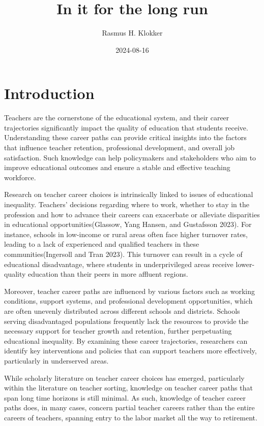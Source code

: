 \documentclass[
]{article}
\title{In it for the long run}
\author{Rasmus H. Klokker}
\date{2024-08-16}
\begin{document}
\maketitle

\hypertarget{introduction}{%
\section{Introduction}\label{introduction}}

Teachers are the cornerstone of the educational system, and their career trajectories significantly impact the quality of education that students receive. Understanding these career paths can provide critical insights into the factors that influence teacher retention, professional development, and overall job satisfaction. Such knowledge can help policymakers and stakeholders who aim to improve educational outcomes and ensure a stable and effective teaching workforce.

Research on teacher career choices is intrinsically linked to issues of educational inequality. Teachers' decisions regarding where to work, whether to stay in the profession and how to advance their careers can exacerbate or alleviate disparities in educational opportunities(Glassow, Yang Hansen, and Gustafsson 2023). For instance, schools in low-income or rural areas often face higher turnover rates, leading to a lack of experienced and qualified teachers in these communities(Ingersoll and Tran 2023). This turnover can result in a cycle of educational disadvantage, where students in underprivileged areas receive lower-quality education than their peers in more affluent regions.

Moreover, teacher career paths are influenced by various factors such as working conditions, support systems, and professional development opportunities, which are often unevenly distributed across different schools and districts. Schools serving disadvantaged populations frequently lack the resources to provide the necessary support for teacher growth and retention, further perpetuating educational inequality. By examining these career trajectories, researchers can identify key interventions and policies that can support teachers more effectively, particularly in underserved areas.

While scholarly literature on teacher career choices has emerged, particularly within the literature on teacher sorting, knowledge on teacher career paths that span long time horizons is still minimal. As such, knowledge of teacher career paths does, in many cases, concern partial teacher careers rather than the entire careers of teachers, spanning entry to the labor market all the way to retirement.
\end{document}
